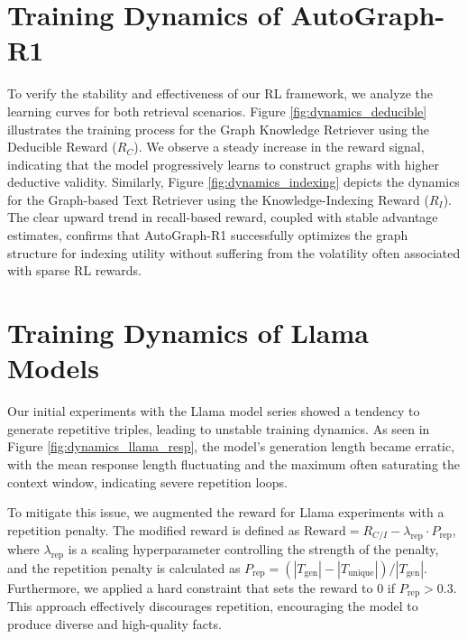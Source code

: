 \documentclass[11pt]{article}
\begin{document}
\section{Training Dynamics of AutoGraph-R1}
\label{sec:dynamics_autograph-r1}
To verify the stability and effectiveness of our RL framework, we analyze the learning curves for both retrieval scenarios. Figure \ref{fig:dynamics_deducible} illustrates the training process for the Graph Knowledge Retriever using the Deducible Reward ($R_C$). We observe a steady increase in the reward signal, indicating that the model progressively learns to construct graphs with higher deductive validity. Similarly, Figure \ref{fig:dynamics_indexing} depicts the dynamics for the Graph-based Text Retriever using the Knowledge-Indexing Reward ($R_I$). The clear upward trend in recall-based reward, coupled with stable advantage estimates, confirms that AutoGraph-R1 successfully optimizes the graph structure for indexing utility without suffering from the volatility often associated with sparse RL rewards.
\section{Training Dynamics of Llama Models}
\label{sec:appendix_llama}
Our initial experiments with the Llama model series showed a tendency to generate repetitive triples, leading to unstable training dynamics. As seen in Figure \ref{fig:dynamics_llama_resp}, the model's generation length became erratic, with the mean response length fluctuating and the maximum often saturating the context window, indicating severe repetition loops.

To mitigate this issue, we augmented the reward for Llama experiments with a repetition penalty. The modified reward is defined as $\text{Reward} = R_{C/I} - \lambda_{\text{rep}} \cdot 
P_{\text{rep}}$, where $\lambda_{\text{rep}}$ is a scaling hyperparameter controlling 
the strength of the penalty, and the repetition penalty is calculated as 
$P_{\text{rep}} = (|T_{\text{gen}}| - |T_{\text{unique}}|) / |T_{\text{gen}}|$. Furthermore, we applied a hard constraint that sets the reward to 0 if $P_{\text{rep}} > 0.3$. This approach effectively discourages repetition, encouraging the model to produce diverse and high-quality facts.
\end{document}
